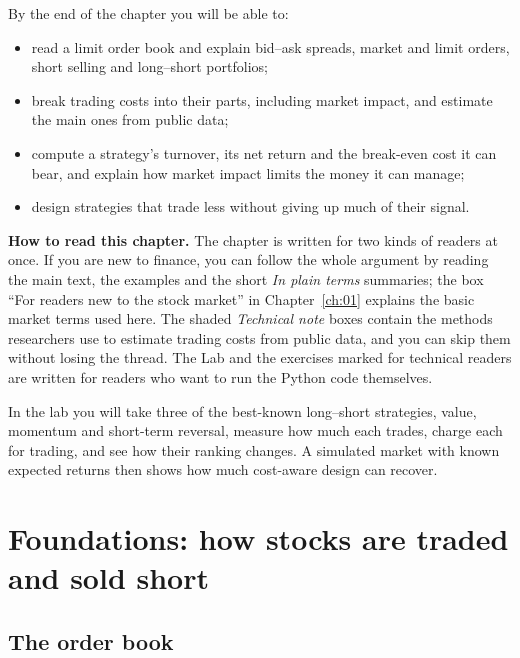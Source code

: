 By the end of the chapter you will be able to:

\begin{itemize}
  \item read a limit order book and explain bid--ask spreads, market and limit orders, short selling and long--short portfolios;
  \item break trading costs into their parts, including market impact, and estimate the main ones from public data;
  \item compute a strategy's turnover, its net return and the break-even cost it can bear, and explain how market impact limits the money it can manage;
  \item design strategies that trade less without giving up much of their signal.
\end{itemize}

\begin{callout}
\textbf{How to read this chapter.} The chapter is written for two kinds of readers at once. If you are new to finance, you can follow the whole argument by reading the main text, the examples and the short \emph{In plain terms} summaries; the box ``For readers new to the stock market'' in Chapter~\ref{ch:01} explains the basic market terms used here. The shaded \emph{Technical note} boxes contain the methods researchers use to estimate trading costs from public data, and you can skip them without losing the thread. The Lab and the exercises marked for technical readers are written for readers who want to run the Python code themselves.
\end{callout}

In the lab you will take three of the best-known long--short strategies, value, momentum and short-term reversal, measure how much each trades, charge each for trading, and see how their ranking changes. A simulated market with known expected returns then shows how much cost-aware design can recover.

\section{Foundations: how stocks are traded and sold short}
\label{sec:17-foundations}

\subsection{The order book}

